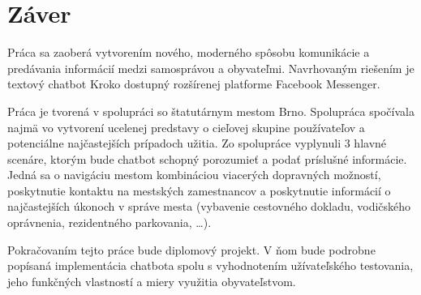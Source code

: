 \documentclass{ExcelAtFIT}
\begin{document}
\section{Záver}

Práca sa zaoberá vytvorením nového, moderného spôsobu komunikácie a predávania informácií medzi samosprávou a obyvateľmi. Navrhovaným riešením je textový chatbot Kroko dostupný rozšírenej platforme Facebook Messenger.

Práca je tvorená v spolupráci so štatutárnym mestom Brno. Spolupráca spočívala najmä vo vytvorení ucelenej predstavy o cieľovej skupine používateľov a potenciálne najčastejších prípadoch užitia.
Zo spolupráce vyplynuli 3 hlavné scenáre, ktorým bude chatbot schopný porozumieť a podať príslušné informácie. \\
Jedná sa o navigáciu mestom kombináciou viacerých dopravných možností, poskytnutie kontaktu na mestských zamestnancov a poskytnutie informácií o najčastejších úkonoch v správe mesta (vybavenie cestovného dokladu, vodičského oprávnenia, rezidentného parkovania, \dots).

Pokračovaním tejto práce bude diplomový projekt. V ňom bude podrobne popísaná implementácia chatbota spolu s vyhodnotením užívateľského testovania, jeho funkčných vlastností a miery využitia obyvateľstvom.




\end{document}

